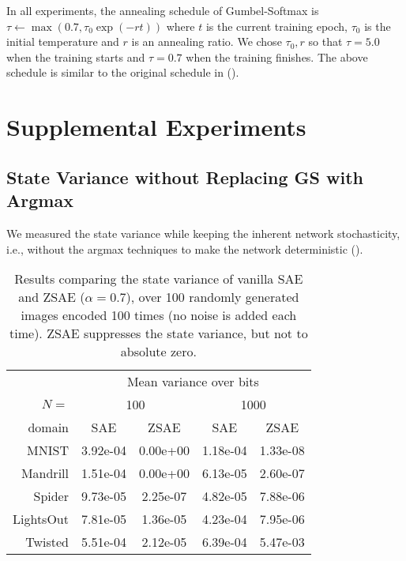\documentclass[10pt,letterpaper]{article}
\begin{document}

In all experiments, 
the annealing schedule of Gumbel-Softmax is $\tau \leftarrow \max (0.7, \tau_0\exp(-rt))$ where
 $t$ is the current training epoch, $\tau_0$ is the initial temperature and $r$ is an annealing ratio.
We chose $\tau_0,r$ so that $\tau = 5.0$ when the training starts and $\tau = 0.7$ when the training finishes.
The above schedule is similar to the original schedule in  \citeauthor{jang2016categorical} (\citeyear{jang2016categorical}).



\section{Supplemental Experiments}


\subsection{State Variance without Replacing GS with Argmax}

We measured the state variance while keeping the inherent network stochasticity,
i.e., without the argmax techniques to
make the network deterministic ().

\begin{table}[htbp]
 \centering
 \setlength{\tabcolsep}{0.45em}
 \begin{tabular}{|r|*{4}{c|}}
       & \multicolumn{4}{c|}{Mean variance over bits} \\
$N=$ %
     & \multicolumn{2}{c|}{100}
     & \multicolumn{2}{c|}{1000} \\
domain   &SAE      &ZSAE     &SAE      &ZSAE     \\ 
MNIST    &3.92e-04 &0.00e+00 &1.18e-04 &1.33e-08 \\ 
Mandrill &1.51e-04 &0.00e+00 &6.13e-05 &2.60e-07 \\ 
Spider   &9.73e-05 &2.25e-07 &4.82e-05 &7.88e-06 \\ 
LightsOut&7.81e-05 &1.36e-05 &4.23e-04 &7.95e-06 \\ 
Twisted  &5.51e-04 &2.12e-05 &6.39e-04 &5.47e-03 \\ 
\end{tabular}
 \caption{Results comparing the state variance of vanilla SAE and ZSAE ($\alpha=0.7$),
 over 100 randomly generated images encoded 100 times (no noise is added each time).
 ZSAE suppresses the state variance, but not to absolute zero.
 }
\label{tab:variance-stochastic}
\end{table}
\end{document}
